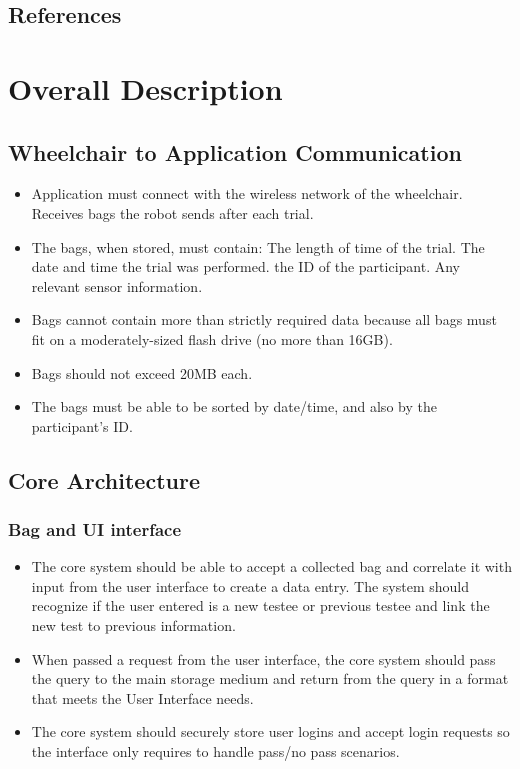 \documentclass[onecolumn, draftclsnofoot,10pt, compsoc]{IEEEtran}
\begin{document}
\subsection{References}

\section{Overall Description}
\subsection{Wheelchair to Application Communication}
\begin{itemize}
	\item Application must connect with the wireless network of the wheelchair.
	\subitem Receives bags the robot sends after each trial.
	\item The bags, when stored, must contain:
	\subitem The length of time of the trial.
	\subitem The date and time the trial was performed.
	\subitem the ID of the participant.
	\subitem Any relevant sensor information.
	\item Bags cannot contain more than strictly required data because all bags must fit on a moderately-sized flash drive (no more than 16GB).
	\item Bags should not exceed 20MB each.
	\item The bags must be able to be sorted by date/time, and also by the participant's ID.
\end{itemize}
\subsection{Core Architecture}
\subsubsection{Bag and UI interface}
\begin{itemize}
	\item The core system should be able to accept a collected bag and correlate it with input from the user interface to create a data entry.
	\subitem The system should recognize if the user entered is a new testee or previous testee and link the new test to previous information.
	\item When passed a request from the user interface, the core system should pass the query to the main storage medium and return from the query in a format that meets the User Interface needs.
	\item The core system should securely store user logins and accept login requests so the interface only requires to handle pass/no pass scenarios.
\end{itemize}
\end{document}
